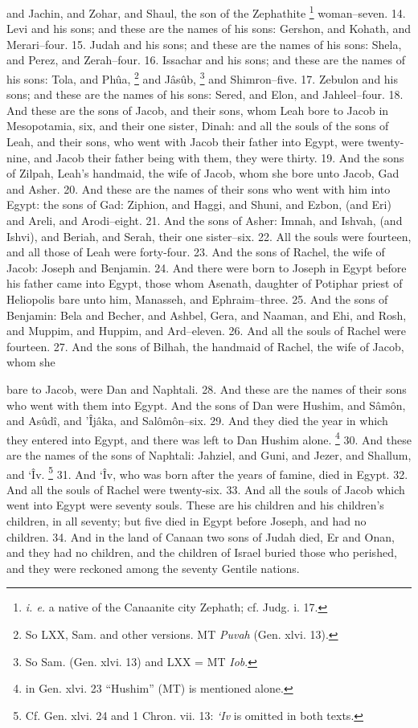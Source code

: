 and Jachin, and Zohar, and Shaul, the son of the Zephathite \footnote{\emph{i. e.} a native of the Canaanite city Zephath; cf. Judg. i. 17.} woman--seven. 14. Levi and his sons; and these are the names of his sons: Gershon, and Kohath, and Merari--four. 15. Judah and his sons; and these are the names of his sons: Shela, and Perez, and Zerah--four. 16. Issachar and his sons; and these are the names of his sons: Tola, and Phûa, \footnote{So LXX, Sam. and other versions. MT \emph{Puvah} (Gen. xlvi. 13).} and Jâsûb, \footnote{So Sam. (Gen. xlvi. 13) and LXX = MT \emph{Iob}.} and Shimron--five. 17. Zebulon and his sons; and these are the names of his sons: Sered, and Elon, and Jahleel--four. 18. And these are the sons of Jacob, and their sons, whom Leah bore to Jacob in Mesopotamia, six, and their one sister, Dinah: and all the souls of the sons of Leah, and their sons, who went with Jacob their father into Egypt, were twenty-nine, and Jacob their father being with them, they were thirty. 19. And the sons of Zilpah, Leah's handmaid, the wife of Jacob, whom she bore unto Jacob, Gad and Asher. 20. And these are the names of their sons who went with him into Egypt: the sons of Gad: Ziphion, and Haggi, and Shuni, and Ezbon, (and Eri) and Areli, and Arodi--eight. 21. And the sons of Asher: Imnah, and Ishvah, (and Ishvi), and Beriah, and Serah, their one sister--six. 22. All the souls were fourteen, and all those of Leah were forty-four. 23. And the sons of Rachel, the wife of Jacob: Joseph and Benjamin. 24. And there were born to Joseph in Egypt before his father came into Egypt, those whom Asenath, daughter of Potiphar priest of Heliopolis bare unto him, Manasseh, and Ephraim--three. 25. And the sons of Benjamin: Bela and Becher, and Ashbel, Gera, and Naaman, and Ehi, and Rosh, and Muppim, and Huppim, and Ard--eleven. 26. And all the souls of Rachel were fourteen. 27. And the sons of Bilhah, the handmaid of Rachel, the wife of Jacob, whom she

bare to Jacob, were Dan and Naphtali. 28. And these are the names of their sons who went with them into Egypt. And the sons of Dan were Hushim, and Sâmôn, and Asûdî, and ’Îjâka, and Salômôn--six. 29. And they died the year in which they entered into Egypt, and there was left to Dan Hushim alone. \footnote{in Gen. xlvi. 23 ``Hushim'' (MT) is mentioned alone.} 30. And these are the names of the sons of Naphtali: Jahziel, and Guni, and Jezer, and Shallum, and ‘Îv. \footnote{Cf. Gen. xlvi. 24 and 1 Chron. vii. 13: \emph{‘Iv} is omitted in both texts.} 31. And ‘Îv, who was born after the years of famine, died in Egypt. 32. And all the souls of Rachel were twenty-six. 33. And all the souls of Jacob which went into Egypt were seventy souls. These are his children and his children's children, in all seventy; but five died in Egypt before Joseph, and had no children. 34. And in the land of Canaan two sons of Judah died, Er and Onan, and they had no children, and the children of Israel buried those who perished, and they were reckoned among the seventy Gentile nations.

